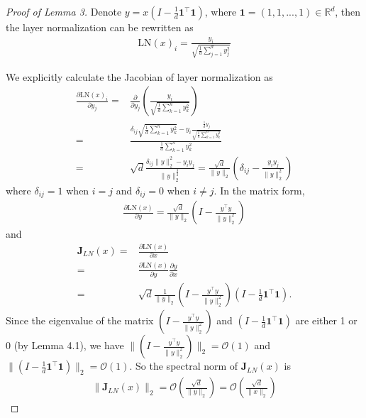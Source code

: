 \documentclass{article}
\begin{document}
\begin{proof}[Proof of Lemma 3]
Denote $y=x(I-\frac{1}{d}\textbf{1}^{\top}\textbf{1})$, where $\textbf{1}=(1,1,...,1)\in \mathbb{R}^d$, then the layer normalization can be rewritten as
\begin{align}
\text{LN}(x)_i=\frac{y_i}{\sqrt{\frac{1}{d}\sum_{j=1}^d y_j^2}}
\end{align}

We explicitly calculate the Jacobian of layer normalization as
\begin{align}
\frac{\partial \text{LN}(x)_i}{\partial y_j}=&\frac{\partial }{\partial y_j}(\frac{y_i}{\sqrt{\frac{1}{d}\sum_{k=1}^n y_k^2}})\\
=&\frac{\delta_{ij}\sqrt{\frac{1}{d}\sum_{k=1}^n y_k^2}-y_i\frac{\frac{1}{d} y_j }{\sqrt{\frac{1}{d}\sum_{k=1}^n y_k^2} }}{\frac{1}{d}\sum_{k=1}^n y_k^2}\\
=&\sqrt{d}\frac{\delta_{ij}\|y\|_2^2-y_iy_j}{\|y\|_2^{\frac{3}{2}}}=\frac{\sqrt{d}}{\|y\|_2}(\delta_{ij}-\frac{y_iy_j}{\|y\|_2^2})
\end{align}
where $\delta_{ij}=1$ when $i=j$ and $\delta_{ij}=0$ when $i\neq j$. In the matrix form,
\begin{align}
    \frac{\partial \text{LN}(x)}{\partial y}=\frac{\sqrt{d}}{\|y\|_2}(I-\frac{y^{\top}y}{\|y\|_2^2})
\end{align}
and
\begin{align}
\mathbf{J}_{LN}(x)=&\frac{\partial \text{LN}(x)}{\partial x}\\
=&\frac{\partial \text{LN}(x)}{\partial y}\frac{\partial y}{\partial x}\\
=&\sqrt{d}\frac{1}{\|y\|_2}(I-\frac{y^{\top}y}{\|y\|_2^2})(I-\frac{1}{d}\textbf{1}^{\top}\textbf{1}).
\end{align}
Since the eigenvalue of the matrix $(I-\frac{y^{\top}y}{\|y\|_2^2})$ and $(I-\frac{1}{d}\textbf{1}^{\top}\textbf{1})$ are either 1 or 0 (by Lemma 4.1), we have $\|(I-\frac{y^{\top}y}{\|y\|_2^2})\|_2=\mathcal{O}(1)$ and $\|(I-\frac{1}{d}\textbf{1}^{\top}\textbf{1})\|_2=\mathcal{O}(1)$. So the spectral norm of $\mathbf{J}_{LN}(x)$ is 
\begin{align}
\|\mathbf{J}_{LN}(x)\|_2=\mathcal{O}(\frac{\sqrt{d}}{\|y\|_2})=\mathcal{O}(\frac{\sqrt{d}}{\|x\|_2})
\end{align}

\end{proof}
\end{document}
